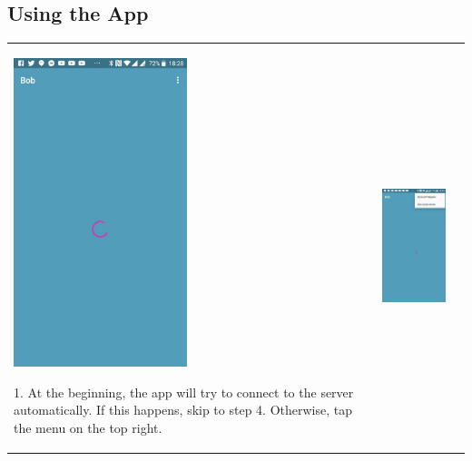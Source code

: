 \documentclass[onecolumn]{IEEEtran}
\begin{document}
\subsection{Using the App}
\begin{table}[H]
  \centering
  \begin{tabular}{ | m{5.5cm} | m{5.5cm} | m{5.5cm} | }
    \hline
    \begin{minipage}{.31\textwidth}
      \includegraphics[width=\linewidth, height=90mm]{one.jpg}
    \end{minipage}
    1. At the beginning, the app will try to connect to the server automatically. If this happens, skip to step 4. Otherwise, tap the menu on the top right.
    &
    \begin{minipage}{.31\textwidth}
      \includegraphics[width=\linewidth, height=90mm]{two.jpg}
    \end{minipage}

\end{tabular}
\end{table}
\end{document}
